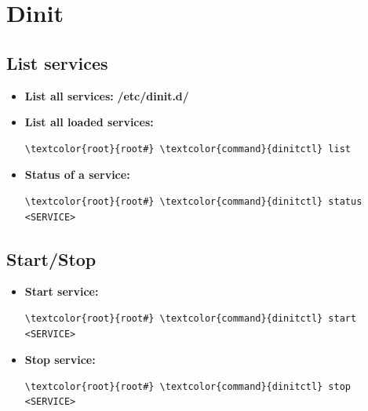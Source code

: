 \documentclass[10pt, a4paper, onecolumn, oneside, titlepage, openany]{book}
\begin{document}
\chapter{Dinit}
\section{List services}
\begin{itemize}
    \item \textbf{List all services:}
\newline \textbf{\textcolor{dir}{/etc/dinit.d/}}
    \item \textbf{List all loaded services:}
\begin{Verbatim}[commandchars=\\\{\}]
\textcolor{root}{root#} \textcolor{command}{dinitctl} list
\end{Verbatim}
    \item \textbf{Status of a service:}
\begin{Verbatim}[commandchars=\\\{\}]
\textcolor{root}{root#} \textcolor{command}{dinitctl} status <SERVICE>
\end{Verbatim}
\end{itemize}

\section{Start/Stop}
\begin{itemize}
    \item \textbf{Start service:}
\begin{Verbatim}[commandchars=\\\{\}]
\textcolor{root}{root#} \textcolor{command}{dinitctl} start <SERVICE>
\end{Verbatim}
    \item \textbf{Stop service:}
\begin{Verbatim}[commandchars=\\\{\}]
\textcolor{root}{root#} \textcolor{command}{dinitctl} stop <SERVICE>
\end{Verbatim}
\end{itemize}
\end{document}

